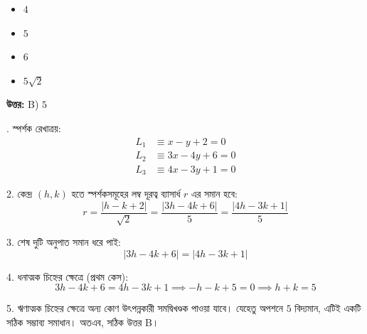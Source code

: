 \documentclass[12pt, a4paper]{article}
\begin{document}
\begin{itemize}[label={}, leftmargin=1cm, itemsep=0.5em]
    \item[\textbf{A)}] $4$
    \item[\textbf{B)}] $5$
    \item[\textbf{C)}] $6$
    \item[\textbf{D)}] $5\sqrt{2}$
\end{itemize}

\vspace{0.5em}
\begin{tcolorbox}[answerbox]
    \textbf{\color{success} উত্তর:} B) $5$
\end{tcolorbox}
\vspace{1em}

\begin{tcolorbox}[solutionbox={সমাধান (Solution)}]
    . স্পর্শক রেখাত্রয়:
    \begin{align*}
        L_1 &\equiv x - y + 2 = 0 \\
        L_2 &\equiv 3x - 4y + 6 = 0 \\
        L_3 &\equiv 4x - 3y + 1 = 0
    \end{align*}
    
    2. কেন্দ্র $(h, k)$ হতে স্পর্শকসমূহের লম্ব দূরত্ব ব্যাসার্ধ $r$ এর সমান হবে:
    \[ r = \frac{|h - k + 2|}{\sqrt{2}} = \frac{|3h - 4k + 6|}{5} = \frac{|4h - 3k + 1|}{5} \]
    
    3. শেষ দুটি অনুপাত সমান ধরে পাই:
    \[ |3h - 4k + 6| = |4h - 3k + 1| \]
    
    4. ধনাত্মক চিহ্নের ক্ষেত্রে (প্রথম কেস):
    \[ 3h - 4k + 6 = 4h - 3k + 1 \implies -h - k + 5 = 0 \implies h + k = 5 \]
    
    5. ঋণাত্মক চিহ্নের ক্ষেত্রে অন্য কোণ উৎপন্নকারী সমদ্বিখণ্ডক পাওয়া যাবে। যেহেতু অপশনে $5$ বিদ্যমান, এটিই একটি সঠিক সম্ভাব্য সমাধান।
    অতএব, সঠিক উত্তর B।
\end{tcolorbox}
\end{document}
